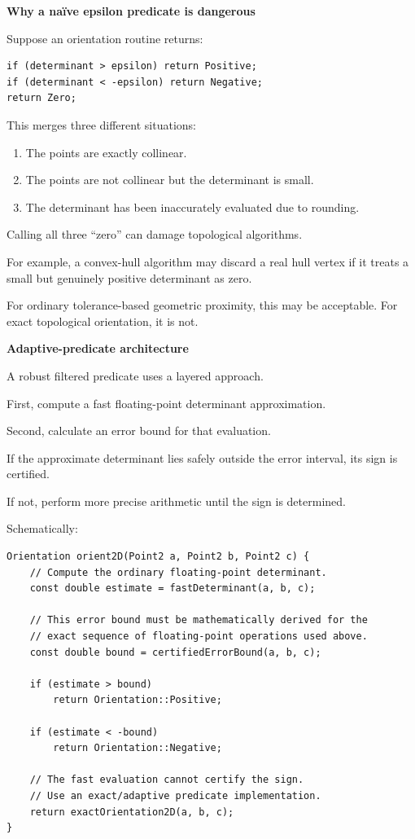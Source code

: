 \textbf{Why a naïve epsilon predicate is dangerous}

Suppose an orientation routine returns:

\begin{verbatim}
if (determinant > epsilon) return Positive;
if (determinant < -epsilon) return Negative;
return Zero;
\end{verbatim}

This merges three different situations:

\begin{enumerate}
\def\labelenumi{\arabic{enumi}.}
\tightlist
\item
  The points are exactly collinear.
\item
  The points are not collinear but the determinant is small.
\item
  The determinant has been inaccurately evaluated due to rounding.
\end{enumerate}

Calling all three ``zero'' can damage topological algorithms.

For example, a convex-hull algorithm may discard a real hull vertex if it treats a small but genuinely positive determinant as zero.

For ordinary tolerance-based geometric proximity, this may be acceptable. For exact topological orientation, it is not.

\textbf{Adaptive-predicate architecture}

A robust filtered predicate uses a layered approach.

First, compute a fast floating-point determinant approximation.

Second, calculate an error bound for that evaluation.

If the approximate determinant lies safely outside the error interval, its sign is certified.

If not, perform more precise arithmetic until the sign is determined.

Schematically:

\begin{verbatim}
Orientation orient2D(Point2 a, Point2 b, Point2 c) {
    // Compute the ordinary floating-point determinant.
    const double estimate = fastDeterminant(a, b, c);

    // This error bound must be mathematically derived for the
    // exact sequence of floating-point operations used above.
    const double bound = certifiedErrorBound(a, b, c);

    if (estimate > bound)
        return Orientation::Positive;

    if (estimate < -bound)
        return Orientation::Negative;

    // The fast evaluation cannot certify the sign.
    // Use an exact/adaptive predicate implementation.
    return exactOrientation2D(a, b, c);
}
\end{verbatim}

